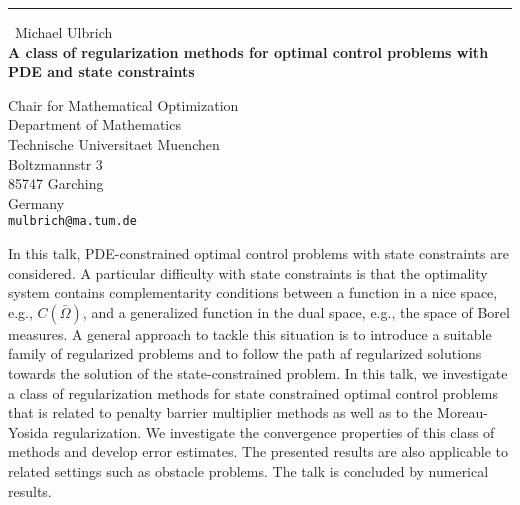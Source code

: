 \documentclass{report}
\begin{document}
\begin{center}
\rule{6in}{1pt} \
{\large Michael Ulbrich \\
{\bf A class of regularization methods for optimal control problems with PDE and state constraints }}

Chair for Mathematical Optimization \\ Department of Mathematics \\ Technische Universitaet Muenchen \\ Boltzmannstr 3 \\ 85747 Garching \\ Germany
\\
{\tt mulbrich@ma.tum.de}\end{center}

In this talk, PDE-constrained optimal control problems with state
constraints are considered. A particular difficulty with state
constraints is that the optimality system contains complementarity
conditions between a function in a nice space, e.g., $C(\bar\Omega)$, and
a generalized function in the dual space, e.g., the space of Borel
measures.
A general approach to tackle this situation is to introduce a suitable
family of regularized problems and to follow the path af regularized
solutions towards the solution of the state-constrained problem.
In this talk, we investigate a class of regularization methods for state
constrained optimal control problems that is related to penalty barrier
multiplier methods as well as to the Moreau-Yosida regularization.
We investigate the convergence properties of this class of methods and
develop error estimates. The presented results are also applicable to
related settings such as obstacle problems. The talk is concluded by
numerical results.
\end{document}
